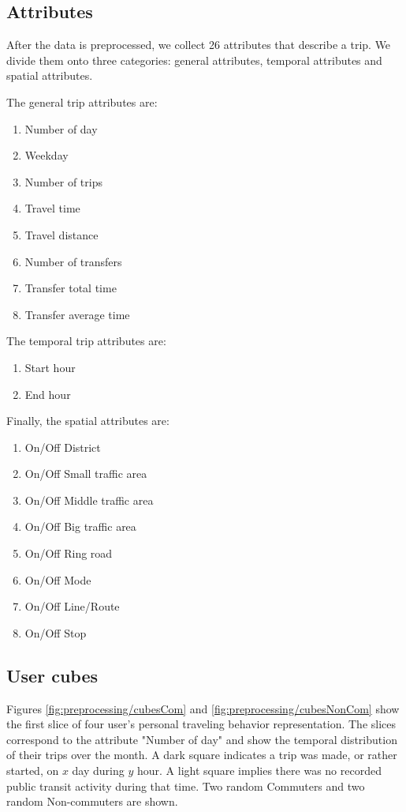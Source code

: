 \documentclass{article}
\begin{document}
\subsection{Attributes}
\label{sec:attributes}
After the data is preprocessed, we collect 26 attributes that describe a trip. We divide them onto three categories: general attributes, temporal attributes and spatial attributes. 

The general trip attributes are: 

\begin{enumerate}
\item Number of day
\item Weekday
\item Number of trips
\item Travel time
\item Travel distance
\item Number of transfers
\item Transfer total time
\item Transfer average time
\end{enumerate}

The temporal trip attributes are:
 
\begin{enumerate}
\item Start hour
\item End hour
\end{enumerate}

Finally, the spatial attributes are:

\begin{enumerate}
\item On/Off District
\item On/Off Small traffic area
\item On/Off Middle traffic area
\item On/Off Big traffic area
\item On/Off Ring road
\item On/Off Mode
\item On/Off Line/Route
\item On/Off Stop
\end{enumerate}

\subsection{User cubes}
\label{sec:userCubes}
Figures \ref{fig:preprocessing/cubesCom} and \ref{fig:preprocessing/cubesNonCom} show the first slice of four user's personal traveling behavior representation. The slices correspond to the attribute "Number of day" and show the temporal distribution of their trips over the month. A dark square indicates a trip was made, or rather started, on $x$ day during $y$ hour. A light square implies there was no recorded public transit activity during that time. Two random Commuters and two random Non-commuters are shown. 
\end{document}
